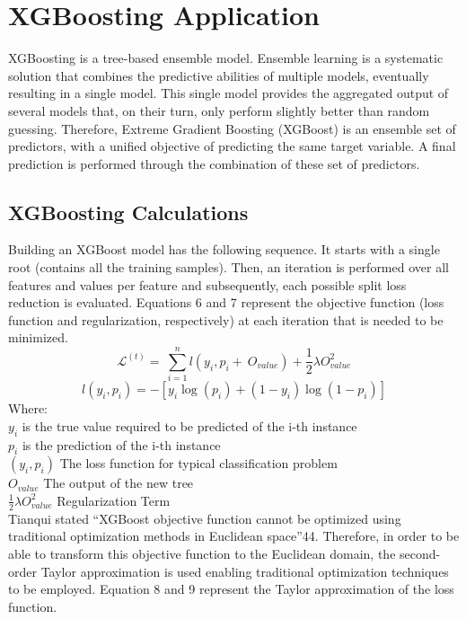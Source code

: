 \section{\ac{XGBoosting} Application}
\ac{XGBoosting} is a tree-based ensemble model. Ensemble learning is a systematic solution that combines the predictive abilities of multiple models, eventually resulting in a single model. This single model provides the aggregated output of several models that, on their turn, only perform slightly better than random guessing. Therefore, Extreme Gradient Boosting (XGBoost) is an ensemble set of predictors, with a unified objective of predicting the same target variable. A final prediction is performed through the combination of these set of predictors.	
\subsection{\ac{XGBoosting} Calculations  }
Building an XGBoost model has the following sequence. It starts with a single root (contains all the training samples). Then, an iteration is performed over all features and values per feature and subsequently, each possible split loss reduction is evaluated. Equations 6 and 7 represent the objective function (loss function and regularization, respectively) at each iteration that is needed to be minimized.
\begin{equation}
\mathcal{L}^{\left(t\right)}=\ \sum_{i=1}^{n}{l\left(y_i,p_i+\ O_{value}\right)+\frac{1}{2}\lambda}O_{value}^2    
\end{equation}
\begin{equation}
    l\left(y_i,p_i\right)=-\left[y_i\log{\left(p_i\right)+\left(1-y_i\right)\log{\left(1-p_i\right)}}\right]
\end{equation}
Where: \\
$y_i$ is the true value required to be predicted of the i-th instance \\
$p_i$ is the prediction of the i-th instance\\
$\left(y_i,p_i\right)$ The loss function for typical classification problem \\
$O_{value}$ The output of the new tree\\
$\frac{1}{2}\lambda O_{value}^2$ Regularization Term\\

Tianqui stated “XGBoost objective function cannot be optimized using traditional optimization methods in Euclidean space”44. Therefore, in order to be able to transform this objective function to the Euclidean domain, the second-order Taylor approximation is used enabling traditional optimization techniques to be employed. Equation 8 and 9 represent the Taylor approximation of the loss function.

